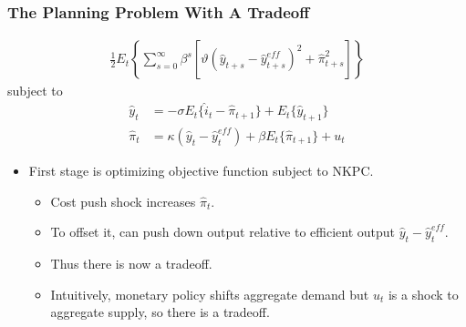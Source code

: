 \documentclass[english,xcolor=svgnames]{beamer}
\begin{document}
\begin{frame}
\frametitle{The Planning Problem With A Tradeoff}
\begin{align*}
		\frac{1}{2}E_t\left\{\sum_{s=0}^{\infty}\beta^s\left[\vartheta (\hat{y}_{t+s}-\hat{y}_{t+s}^{eff})^2+\hat{\pi}_{t+s}^2\right]\right\}
	\end{align*}
	subject to
	\begin{align*}
		\hat{y}_t &=-\sigma E_t\{\hat{i}_t-\hat{\pi}_{t+1}\}+E_t\{\hat{y}_{t+1}\} \\
		\hat{\pi}_t&=\kappa(\hat{y}_{t} - \hat{y}_{t}^{eff}) +\beta E_t \{\hat{\pi}_{t+1}\} + u_t 
	\end{align*}	
\begin{itemize}
	\item First stage is optimizing objective function subject to NKPC.
	\begin{itemize}
		\item Cost push shock increases $\hat{\pi}_t$.
		\item To offset it, can push down output relative to efficient output $\hat{y}_{t} - \hat{y}_{t}^{eff}$.
		\item Thus there is now a tradeoff.
		\item Intuitively, monetary policy shifts aggregate demand but $u_t$ is a
shock to aggregate supply, so there is a tradeoff.
	\end{itemize}
\end{itemize}
\end{frame}
\end{document}
